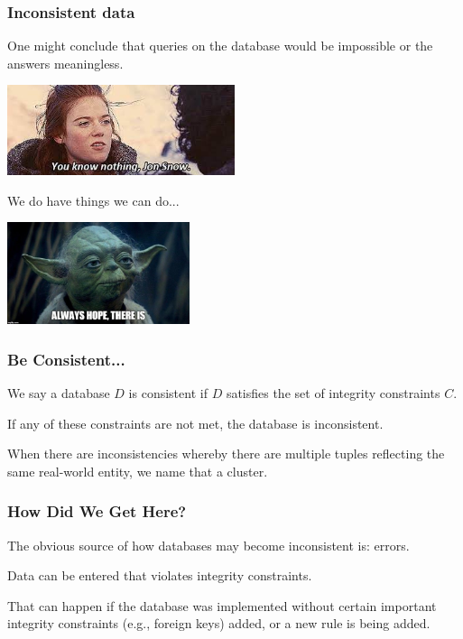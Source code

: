 \begin{frame}
\frametitle{Inconsistent data}

One might conclude that queries on the database would be impossible or the answers meaningless.

\begin{center}
	\includegraphics[width=0.5\textwidth]{images/jonsnow.jpg}
\end{center}

We do have things we can do...

\begin{center}
	\includegraphics[width=0.4\textwidth]{images/hope.jpg}
\end{center}

\end{frame}


\begin{frame}
\frametitle{Be Consistent...}

We say a database $D$ is \alert{consistent} if $D$ satisfies the set of integrity constraints $C$.

If any of these constraints are not met, the database is \alert{inconsistent}.

When there are inconsistencies whereby there are multiple tuples reflecting the same real-world entity, we name that a \alert{cluster}.


\end{frame}

\begin{frame}
\frametitle{How Did We Get Here?}

The obvious source of how databases may become inconsistent is: errors. 

Data can be entered that violates integrity constraints. 

That can happen if the database was implemented without certain important integrity constraints (e.g., foreign keys) added, or a new rule is being added. 

\end{frame}

